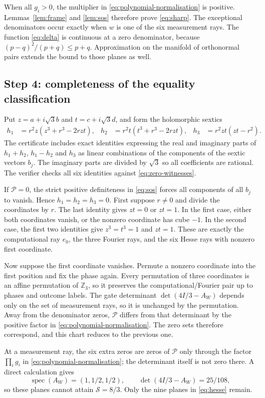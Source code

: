 \documentclass[11pt,a4paper]{article}
\numberwithin{equation}{section}
\theoremstyle{remark}\newtheorem{remark}[theorem]{Remark}
\begin{document}
When all $g_i>0$, the multiplier in \eqref{eq:polynomial-normalisation} is positive. Lemmas~\ref{lem:frame} and \ref{lem:sos} therefore prove \eqref{eq:sharp}. The exceptional denominators occur exactly when $w$ is one of the six measurement rays. The function \eqref{eq:delta} is continuous at a zero denominator, because $(p-q)^2/(p+q)\le p+q$. Approximation on the manifold of orthonormal pairs extends the bound to those planes as well.

\subsection{Step 4: completeness of the equality classification}
Put $z=a+i\sqrt3b$ and $t=c+i\sqrt3d$, and form the holomorphic sextics
\begin{align}
h_1&=r^2z(z^3+r^3-2rzt),&
h_2&=r^2t(t^3+r^3-2rzt),&
h_3&=r^2zt(zt-r^2).
\label{eq:zero-witnesses}
\end{align}
The certificate includes exact identities expressing the real and imaginary parts of $h_1+h_2$, $h_1-h_2$ and $h_3$ as linear combinations of the components of the sextic vectors $b_j$. The imaginary parts are divided by $\sqrt3$ so all coefficients are rational. The verifier checks all six identities against \eqref{eq:zero-witnesses}.

If $\mathcal P=0$, the strict positive definiteness in \eqref{eq:sos} forces all components of all $b_j$ to vanish. Hence $h_1=h_2=h_3=0$. First suppose $r\ne0$ and divide the coordinates by $r$. The last identity gives $zt=0$ or $zt=1$. In the first case, either both coordinates vanish, or the nonzero coordinate has cube $-1$. In the second case, the first two identities give $z^3=t^3=1$ and $zt=1$. These are exactly the computational ray $e_0$, the three Fourier rays, and the six Hesse rays with nonzero first coordinate.

Now suppose the first coordinate vanishes. Permute a nonzero coordinate into the first position and fix the phase again. Every permutation of three coordinates is an affine permutation of $\mathbb Z_3$, so it preserves the computational/Fourier pair up to phases and outcome labels. The gate determinant $\det(4I/3-A_W)$ depends only on the set of measurement rays, so it is unchanged by the permutation. Away from the denominator zeros, $\mathcal P$ differs from that determinant by the positive factor in \eqref{eq:polynomial-normalisation}. The zero sets therefore correspond, and this chart reduces to the previous one.

At a measurement ray, the six extra zeros are zeros of $\mathcal P$ only through the factor $\prod_ig_i$ in \eqref{eq:polynomial-normalisation}; the determinant itself is not zero there. A direct calculation gives
\[
\operatorname{spec}(A_W)=(1,1/2,1/2),\qquad
\det(4I/3-A_W)=25/108,
\]
so these planes cannot attain $\mathcal S=8/3$. Only the nine planes in \eqref{eq:hesse} remain.
\end{document}
